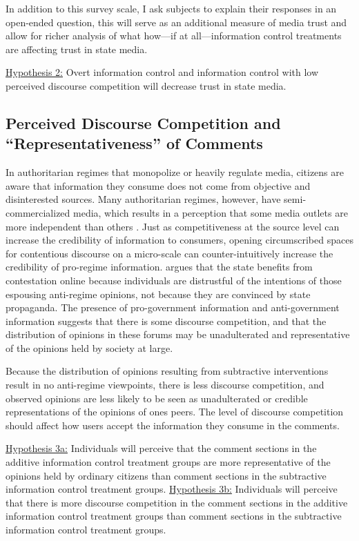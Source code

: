 \documentclass[11pt]{article}
\begin{document}
In addition to this survey scale, I ask subjects to explain their responses in an open-ended question, this will serve as an additional measure of media trust and allow for richer analysis of what how---if at all---information control treatments are affecting trust in state media.

\noindent\underline{Hypothesis 2:} Overt information control and information control with low perceived discourse competition will decrease trust in state media.\newline

\subsection{Perceived Discourse Competition and ``Representativeness'' of Comments}

In authoritarian regimes that monopolize or heavily regulate media, citizens are aware that information they consume does not come from objective and disinterested sources. Many authoritarian regimes, however, have semi-commercialized media, which results in a perception that some media outlets are more independent than others \citep{stockmann2013media}. Just as competitiveness at the source level can increase the credibility of information to consumers, opening circumscribed spaces for contentious discourse on a micro-scale can counter-intuitively increase the credibility of pro-regime information. \cite{han2018contesting} argues that the state benefits from contestation online because individuals are distrustful of the intentions of those espousing anti-regime opinions, not because they are convinced by state propaganda. The presence of pro-government information and anti-government information suggests that there is some discourse competition, and that the distribution of opinions in these forums may be unadulterated and representative of the opinions held by society at large.

Because the distribution of opinions resulting from subtractive interventions result in no anti-regime viewpoints, there is less discourse competition, and observed opinions are less likely to be seen as unadulterated or credible representations of the opinions of ones peers. The level of discourse competition should affect how users accept the information they consume in the comments.

\noindent\underline{Hypothesis 3a:} Individuals will perceive that the comment sections in the additive information control treatment groups are more representative of the opinions held by ordinary citizens than comment sections in the subtractive information control treatment groups.\newline
\noindent\underline{Hypothesis 3b:} Individuals will perceive that there is more discourse competition in the comment sections in the additive information control treatment groups than comment sections in the subtractive information control treatment groups.\newline
\end{document}
